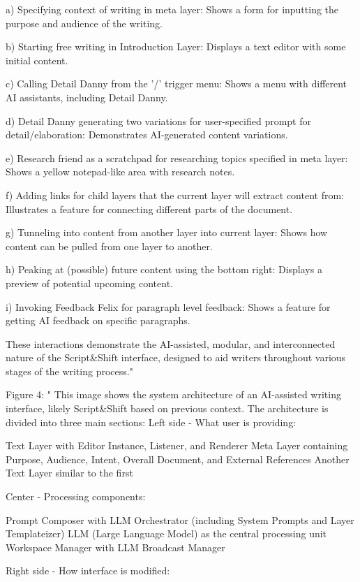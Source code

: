 a) Specifying context of writing in meta layer: Shows a form for inputting the purpose and audience of the writing.

b) Starting free writing in Introduction Layer: Displays a text editor with some initial content.

c) Calling Detail Danny from the '/' trigger menu: Shows a menu with different AI assistants, including Detail Danny.

d) Detail Danny generating two variations for user-specified prompt for detail/elaboration: Demonstrates AI-generated content variations.

e) Research friend as a scratchpad for researching topics specified in meta layer: Shows a yellow notepad-like area with research notes.

f) Adding links for child layers that the current layer will extract content from: Illustrates a feature for connecting different parts of the document.

g) Tunneling into content from another layer into current layer: Shows how content can be pulled from one layer to another.

h) Peaking at (possible) future content using the bottom right: Displays a preview of potential upcoming content.

i) Invoking Feedback Felix for paragraph level feedback: Shows a feature for getting AI feedback on specific paragraphs.

These interactions demonstrate the AI-assisted, modular, and interconnected nature of the Script&Shift interface, designed to aid writers throughout various stages of the writing process."

Figure 4: "
This image shows the system architecture of an AI-assisted writing interface, likely Script&Shift based on previous context. The architecture is divided into three main sections:
Left side - What user is providing:

Text Layer with Editor Instance, Listener, and Renderer
Meta Layer containing Purpose, Audience, Intent, Overall Document, and External References
Another Text Layer similar to the first

Center - Processing components:

Prompt Composer with LLM Orchestrator (including System Prompts and Layer Templateizer)
LLM (Large Language Model) as the central processing unit
Workspace Manager with LLM Broadcast Manager

Right side - How interface is modified:

